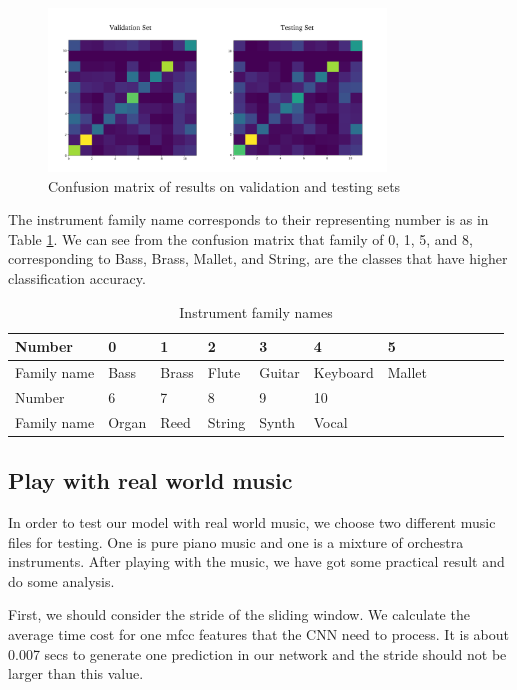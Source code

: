 \documentclass{article}
\begin{document}
\begin{figure}[h!]
\centering
\includegraphics[width=0.8\textwidth]{confusionmatrix.png}
\caption{Confusion matrix of results on validation and testing sets}
\label{fig:confusionmatrix}
\end{figure}

\noindent The instrument family name corresponds to their representing number is as in Table \ref{tab:confusionmatrix}. We can see from the confusion matrix that family of 0, 1, 5, and 8, corresponding to Bass, Brass, Mallet, and String, are the classes that have higher classification accuracy.

\begin{table}[t]
  \caption{Instrument family names}
  \label{tab:confusionmatrix}
  \centering
  \begin{tabular}{llllllllllll}
    \toprule
    Number  &0 &1 &2 &3 &4 &5\\
    \midrule
    Family name &Bass & Brass & Flute & Guitar & Keyboard &Mallet\\
    \toprule
    Number  &6 &7 &8 &9 &10\\
    \midrule
    Family name &Organ & Reed	& String    & Synth	& Vocal\\
    \bottomrule
  \end{tabular}
\end{table}

\subsection{Play with real world music}

\noindent In order to test our model with real world music, we choose two different music files for testing. One is pure piano music and one is a mixture of orchestra instruments. After playing with the music, we have got some practical result and do some analysis.

\noindent First, we should consider the stride of the sliding window. We calculate the average time cost for one mfcc features that the CNN need to process. It is about 0.007 secs to generate one prediction in our network and the stride should not be larger than this value.
\end{document}
